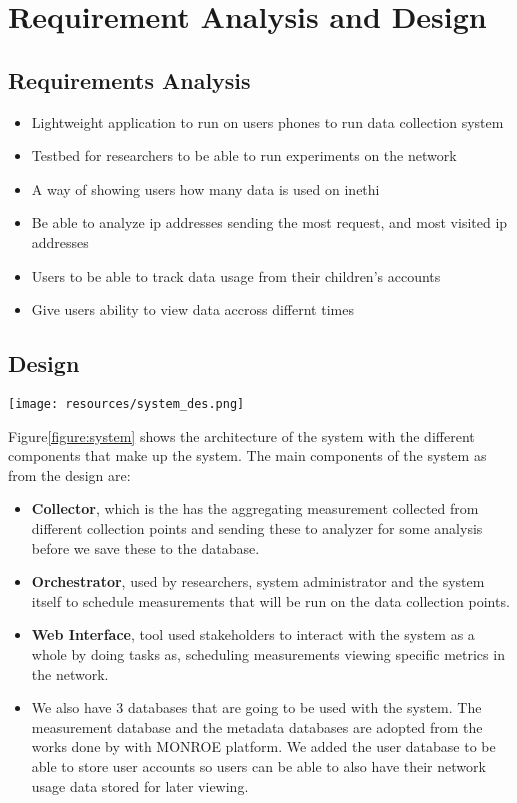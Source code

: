 \section{Requirement Analysis and Design}\label{sec:design-decision}
\subsection{Requirements Analysis}\label{subsec:requirements-analysis}
\begin{itemize}
    \item Lightweight application to run on users phones to run data collection system
    \item Testbed for researchers to be able to run experiments on the network
    \item A way of showing users how many data is used on inethi
    \item Be able to analyze ip addresses sending the most request, and most visited ip addresses
    \item Users to be able to track data usage from their children's accounts
    \item Give users ability to view data accross differnt times
\end{itemize}
\subsection{Design}\label{subsec:design}
\begin{figure*}
    \begin{center}
        \texttt{[image: resources/system\_des.png]}
    \end{center}
    \caption{Showing the system overview, different components making the system and the communication directions between these components in the systems.}
    \label{figure:system}
\end{figure*}
Figure\ref{figure:system} shows the architecture of the system with the different components that make up the system.
The main components of the system as from the design are:
\begin{itemize}
    \item \textbf{Collector}, which is the has the aggregating measurement collected from different collection points and sending these to analyzer for some analysis before we save these to the database.
    \item \textbf{Orchestrator}, used by researchers, system administrator and the system itself to schedule measurements that will be run on the data collection points.
    \item \textbf{Web Interface}, tool used stakeholders to interact with the system as a whole by doing tasks as, scheduling measurements viewing specific metrics in the network.
    \item We also have 3 databases that are going to be used with the system.
    The measurement database and the metadata databases are adopted from the works done by\cite{7523537} with MONROE platform.
    We added the user database to be able to store user accounts so users can be able to also have their network usage data stored for later viewing.
\end{itemize}
